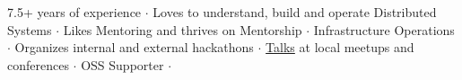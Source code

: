 

\begin{cvparagraph}
7.5+ years of experience ${\cdotp}$ Loves to understand, build and operate Distributed Systems ${\cdotp}$ Likes Mentoring and thrives on Mentorship ${\cdotp}$ Infrastructure Operations ${\cdotp}$ Organizes internal and external hackathons ${\cdotp}$ \href{https://github.com/ashwanthkumar/talks}{Talks} at local meetups and conferences ${\cdotp}$ OSS Supporter ${\cdotp}$
\end{cvparagraph}
